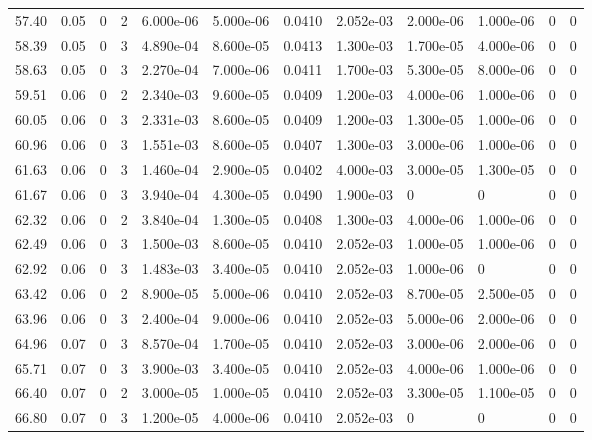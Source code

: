 \documentclass[preview]{standalone}
\begin{document}
{{{{\begin{tabular}{L{1.2cm}C{1.2cm} C{0.3cm}C{0.5cm} C{1.4cm}C{1.4cm} C{1.4cm}C{1.4cm} C{1.6cm}C{1.6cm} C{1.6cm}C{1.6cm}}
  57.40  &  0.05  & 0     &  2 &  6.000e-06  & 5.000e-06  &  0.0410&   2.052e-03& 2.000e-06 & 1.000e-06   &  0 & 0  \\ 
  58.39  &  0.05  & 0     &  3 &  4.890e-04  & 8.600e-05  &  0.0413&   1.300e-03& 1.700e-05 & 4.000e-06   &  0 & 0  \\ 
  58.63  &  0.05  & 0     &  3 &  2.270e-04  & 7.000e-06  &  0.0411&   1.700e-03& 5.300e-05 & 8.000e-06   &  0 & 0  \\ 
  59.51  &  0.06  & 0     &  2 &  2.340e-03  & 9.600e-05  &  0.0409&   1.200e-03& 4.000e-06 & 1.000e-06   &  0 & 0  \\ 
  60.05  &  0.06  & 0     &  3 &  2.331e-03  & 8.600e-05  &  0.0409&   1.200e-03& 1.300e-05 & 1.000e-06   &  0 & 0  \\ 
  60.96  &  0.06  & 0     &  3 &  1.551e-03  & 8.600e-05  &  0.0407&   1.300e-03& 3.000e-06 & 1.000e-06   &  0 & 0  \\ 
  61.63  &  0.06  & 0     &  3 &  1.460e-04  & 2.900e-05  &  0.0402&   4.000e-03& 3.000e-05 & 1.300e-05   &  0 & 0  \\ 
  61.67  &  0.06  & 0     &  3 &  3.940e-04  & 4.300e-05  &  0.0490&   1.900e-03& 0 & 0   &  0 & 0  \\ 
  62.32  &  0.06  & 0     &  2 &  3.840e-04  & 1.300e-05  &  0.0408&   1.300e-03& 4.000e-06 & 1.000e-06   &  0 & 0  \\ 
  62.49  &  0.06  & 0     &  3 &  1.500e-03  & 8.600e-05  &  0.0410&   2.052e-03& 1.000e-05 & 1.000e-06   &  0 & 0  \\ 
  62.92  &  0.06  & 0     &  3 &  1.483e-03  & 3.400e-05  &  0.0410&   2.052e-03& 1.000e-06 & 0   &  0 & 0  \\ 
  63.42  &  0.06  & 0     &  2 &  8.900e-05  & 5.000e-06  &  0.0410&   2.052e-03& 8.700e-05 & 2.500e-05   &  0 & 0  \\ 
  63.96  &  0.06  & 0     &  3 &  2.400e-04  & 9.000e-06  &  0.0410&   2.052e-03& 5.000e-06 & 2.000e-06   &  0 & 0  \\ 
  64.96  &  0.07  & 0     &  3 &  8.570e-04  & 1.700e-05  &  0.0410&   2.052e-03& 3.000e-06 & 2.000e-06   &  0 & 0  \\ 
  65.71  &  0.07  & 0     &  3 &  3.900e-03  & 3.400e-05  &  0.0410&   2.052e-03& 4.000e-06 & 1.000e-06   &  0 & 0  \\ 
  66.40  &  0.07  & 0     &  2 &  3.000e-05  & 1.000e-05  &  0.0410&   2.052e-03& 3.300e-05 & 1.100e-05   &  0 & 0  \\ 
  66.80  &  0.07  & 0     &  3 &  1.200e-05  & 4.000e-06  &  0.0410&   2.052e-03& 0 & 0   &  0 & 0  \\ 

\end{tabular}}}}}
\end{document}
